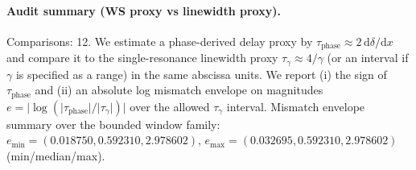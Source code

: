 \paragraph{Audit summary (WS proxy vs linewidth proxy).} \AuditTag Comparisons: 12. We estimate a phase-derived delay proxy by $\tau_{\mathrm{phase}}\approx 2\,\mathrm{d}\delta/\mathrm{d}x$ and compare it to the single-resonance linewidth proxy $\tau_{\gamma}\approx 4/\gamma$ (or an interval if $\gamma$ is specified as a range) in the same abscissa units. We report (i) the sign of $\tau_{\mathrm{phase}}$ and (ii) an absolute log mismatch envelope on magnitudes $e=\lvert\log(\lvert\tau_{\mathrm{phase}}\rvert/\lvert\tau_{\gamma}\rvert)\rvert$ over the allowed $\tau_{\gamma}$ interval.
\noindent\AuditTag Mismatch envelope summary over the bounded window family: $e_{\min}=(0.018750,0.592310,2.978602)$, $e_{\max}=(0.032695,0.592310,2.978602)$ (min/median/max).